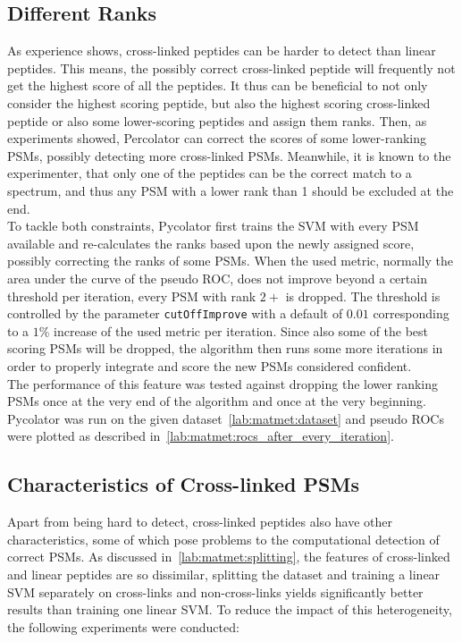 \subsection{Different Ranks}
\label{lab:matmet:ranks}
As experience shows, cross-linked peptides can be harder to detect than linear peptides. This means, the possibly correct cross-linked peptide will frequently not get the highest score of all the peptides. It thus can be beneficial to not only consider the highest scoring peptide, but also the highest scoring cross-linked peptide or also some lower-scoring peptides and assign them ranks. Then, as experiments showed, Percolator can correct the scores of some lower-ranking PSMs, possibly detecting more cross-linked PSMs. Meanwhile, it is known to the experimenter, that only one of the peptides can be the correct match to a spectrum, and thus any PSM with a lower rank than 1 should be excluded at the end.\\
To tackle both constraints, Pycolator first trains the SVM with every PSM available and re-calculates the ranks based upon the newly assigned score, possibly correcting the ranks of some PSMs. When the used metric, normally the area under the curve of the pseudo ROC, does not improve beyond a certain threshold per iteration, every PSM with rank $2+$ is dropped. The threshold is controlled by the parameter \texttt{cutOffImprove} with a default of $0.01$ corresponding to a $1\%$ increase of the used metric per iteration. Since also some of the best scoring PSMs will be dropped, the algorithm then runs some more iterations in order to properly integrate and score the new PSMs considered confident.\\
The performance of this feature was tested against dropping the lower ranking PSMs once at the very end of the algorithm and once at the very beginning. Pycolator was run on the given dataset~\ref{lab:matmet:dataset} and pseudo ROCs were plotted as described in~\ref{lab:matmet:rocs_after_every_iteration}.
\subsection{Characteristics of Cross-linked PSMs}
Apart from being hard to detect, cross-linked peptides also have other characteristics, some of which pose problems to the computational detection of correct PSMs. As discussed in~\ref{lab:matmet:splitting}, the features of cross-linked and linear peptides are so dissimilar, splitting the dataset and training a linear SVM separately on cross-links and non-cross-links yields significantly better results than training one linear SVM. To reduce the impact of this heterogeneity, the following experiments were conducted:
